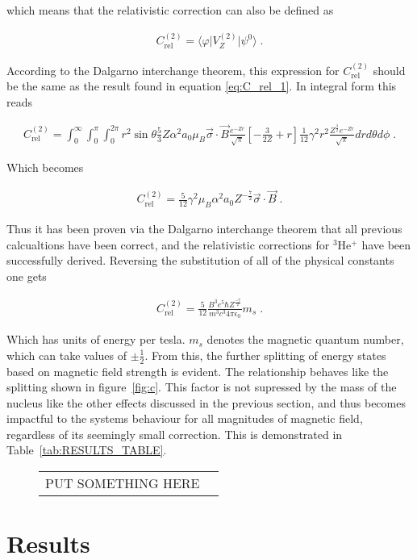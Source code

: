             \noindent which means that the relativistic correction can also be defined as 

            \begin{align}
                C_{\text{rel}}^{(2)} = \langle \varphi \vert V_{Z}^{(2)} \vert \psi^0 \rangle\;.
            \end{align}

            According to the Dalgarno interchange theorem, this expression for $C_{\text{rel}}^{(2)}$ should be the same as the result found in equation \eqref{eq:C_rel_1}. In integral form this reads 

            \footnotesize
            \begin{align}
                C_{\text{rel}}^{(2)} = \int_0^\infty \int_0^\pi \int_0^{2\pi} r^2 \sin\theta \frac{5}{3} Z \alpha^2 a_0 \mu_B \vec{\sigma} \cdot \vec{B} \frac{e^{-Zr}}{\sqrt{\pi}} \left[ - \frac{3}{2Z} + r \right] \frac{1}{12} \gamma^2 r^2 \frac{Z^{\frac{3}{2}} e^{-Zr}}{\sqrt{\pi}} dr d\theta d\phi\;.
            \end{align}

            \normalsize Which becomes

            \begin{align}
                C_{\text{rel}}^{(2)} = \frac{5}{12} \gamma^2 \mu_B \alpha^2 a_0 Z^{-\frac{7}{2}} \vec{\sigma} \cdot \vec{B} \;. \label{eq:C_rel_2}
            \end{align}

            \noindent Thus it has been proven via the Dalgarno interchange theorem that all previous calcualtions have been correct, and the relativistic corrections for $^3$He$^+$ have been successfully derived. Reversing the substitution of all of the physical constants one gets 

            \begin{align}
                C_{\text{rel}}^{(2)} = \frac{5}{12} \frac{B^3 e^5 \hbar Z^{\frac{-7}{2}}}{m^3 c^3 4\pi \epsilon_0} m_s\;.
            \end{align}

            \noindent Which has units of energy per tesla. $m_s$ denotes the magnetic quantum number, which can take values of $\pm \frac{1}{2}$. From this, the further splitting of energy states based on magnetic field strength is evident. The relationship behaves like the splitting shown in figure~\ref{fig:c}. This factor is not supressed by the mass of the nucleus like the other effects discussed in the previous section, and thus becomes impactful to the systems behaviour for all magnitudes of magnetic field, regardless of its seemingly small correction. This is demonstrated in Table~\ref{tab:RESULTS_TABLE}.

            \begin{figure}
                \centering
                \begin{tabular}{c c }
                    PUT SOMETHING HERE
                \end{tabular}
            \end{figure}
    \section{Results}\label{sec:results}





